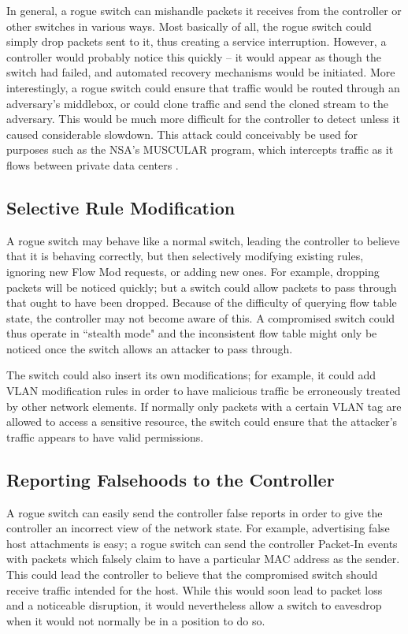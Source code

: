 In general, a rogue switch can mishandle packets it receives from the controller or other switches in various ways. Most basically of all, the rogue switch could simply drop packets sent to it, thus creating a service interruption. However, a controller would probably notice this quickly -- it would appear as though the switch had failed, and automated recovery mechanisms would be initiated. More interestingly, a rogue switch could ensure that traffic would be routed through an adversary's middlebox, or could clone traffic and send the cloned stream to the adversary. This would be much more difficult for the controller to detect unless it caused considerable slowdown. This attack could conceivably be used for purposes such as the NSA's MUSCULAR program, which intercepts traffic as it flows between private data centers \cite{muscular}. 


\subsection{Selective Rule Modification}
A rogue switch may behave like a normal switch, leading the controller to believe that it is behaving correctly, but then selectively modifying existing rules, ignoring new Flow Mod requests, or adding new ones. For example, dropping packets will be noticed quickly; but a switch could allow packets to pass through that ought to have been dropped. Because of the difficulty of querying flow table state, the controller may not become aware of this. A compromised switch could thus operate in ``stealth mode" and the inconsistent flow table might only be noticed once the switch allows an attacker to pass through.

The switch could also insert its own modifications; for example, it could add VLAN modification rules in order to have malicious traffic be erroneously treated by other network elements. If normally only packets with a certain VLAN tag are allowed to access a sensitive resource, the switch could ensure that the attacker's traffic appears to have valid permissions.

\subsection{Reporting Falsehoods to the Controller}

A rogue switch can easily send the controller false reports in order to give the controller an incorrect view of the network state. For example, advertising false host attachments is easy; a rogue switch can send the controller Packet-In events with packets which falsely claim to have a particular MAC address as the sender. This could lead the controller to believe that the compromised switch should receive traffic intended for the host. While this would soon lead to packet loss and a noticeable disruption, it would nevertheless allow a switch to eavesdrop when it would not normally be in a position to do so.

